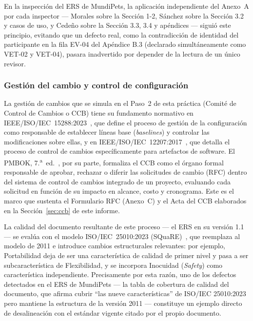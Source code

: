 \documentclass[journal,onecolumn]{IEEEtran}
\begin{document}
	En la inspección del ERS de MundiPets, la aplicación independiente
	del Anexo~A por cada inspector --- Morales sobre la Sección 1-2,
	Sánchez sobre la Sección 3.2 y casos de uso, y Cedeño sobre la
	Sección 3.3, 3.4 y apéndices --- siguió este principio, evitando
	que un defecto real, como la contradicción de identidad del
	participante en la fila EV-04 del Apéndice B.3 (declarado
	simultáneamente como VET-02 y VET-04), pasara inadvertido por
	depender de la lectura de un único revisor.
	
	\subsubsection{Gestión del cambio y control de configuración}
	
	La gestión de cambios que se simula en el Paso~2 de esta práctica
	(Comité de Control de Cambios o CCB) tiene su fundamento normativo
	en IEEE/ISO/IEC~15288:2023~\cite{ieee15288_2023}, que define el
	proceso de gestión de la configuración como responsable de
	establecer líneas base (\emph{baselines}) y controlar las
	modificaciones sobre ellas, y en
	IEEE/ISO/IEC~12207:2017~\cite{ieee12207_2017}, que detalla el
	proceso de control de cambios específicamente para artefactos de
	software. El PMBOK, 7.\textsuperscript{a}~ed.~\cite{pmi2021}, por
	su parte, formaliza el CCB como el órgano formal responsable de
	aprobar, rechazar o diferir las solicitudes de cambio (RFC) dentro
	del sistema de control de cambios integrado de un proyecto,
	evaluando cada solicitud en función de su impacto en alcance,
	costo y cronograma. Este es el marco que sustenta el Formulario RFC
	(Anexo~C) y el Acta del CCB elaborados en la
	Sección~\ref{sec:ccb} de este informe.
	
	La calidad del documento resultante de este proceso --- el ERS en
	su versión 1.1 --- se evalúa con el modelo ISO/IEC~25010:2023
	(SQuaRE)~\cite{iso25010_2023}, que reemplaza al modelo de 2011 e
	introduce cambios estructurales relevantes: por ejemplo,
	Portabilidad deja de ser una característica de calidad de primer
	nivel y pasa a ser subcaracterística de Flexibilidad, y se
	incorpora Inocuidad (\emph{Safety}) como característica
	independiente. Precisamente por esta razón, uno de los defectos
	detectados en el ERS de MundiPets --- la tabla de cobertura de
	calidad del documento, que afirma cubrir ``las nueve
	características'' de ISO/IEC 25010:2023 pero mantiene la estructura
	de la versión 2011 --- constituye un ejemplo directo de
	desalineación con el estándar vigente citado por el propio
	documento.
	
\end{document}
